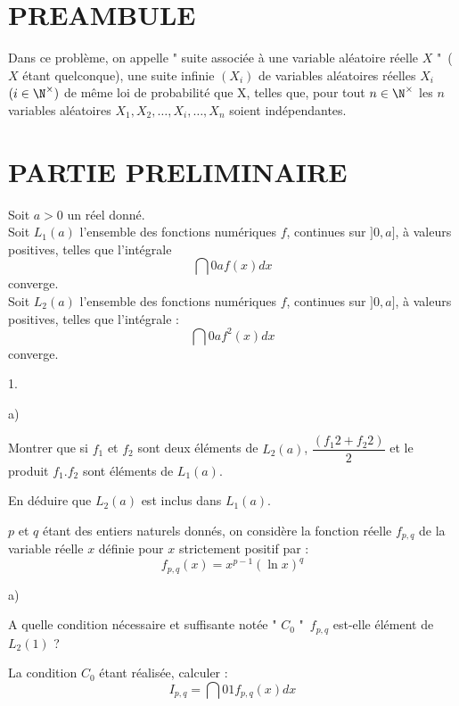 \documentclass[11pt]{article}%
\begin{document}
\section*{PREAMBULE}

Dans ce problème, on appelle " suite associée à une variable aléatoire
réelle $X$ "\ ($X$ étant quelconque), une suite infinie $(X_{i})$ de
variables
aléatoires réelles $X_{i}$ $(i\in \N^{\times })$ de même loi de
probabilité que X, telles que, pour tout $n\in \N^{\times }$ les $n$
variables aléatoires $X_{1},X_{2},\dots,X_{i},\dots,X_{n}$ soient
indépendantes.

\section*{PARTIE PRELIMINAIRE}

Soit $a>0$ un réel donné.\\
Soit $L_{1}(a)$ l'ensemble des fonctions numériques $f$, continues sur
$]0,a] $, à valeurs positives, telles que l'intégrale 
\[
\dint{0}{a}f(x)dx
\]
converge.\\
Soit $L_{2}(a)$ l'ensemble des fonctions numériques $f$, continues sur
$]0,a] $, à valeurs positives, telles que l'intégrale : 
\[
\dint{0}{a}f^{2}(x)dx
\]
converge.

\begin{noliste}{1.}
 \setlength{\itemsep}{4mm}
\item 

\begin{noliste}{a)}
 \setlength{\itemsep}{2mm}
\item Montrer que si $f_{1}$ et $f_{2}$ sont deux éléments de
$L_{2}(a)$, ${\dfrac{(f_{1}{2} + f_{2}{2})}{2}}$ et le produit
$f_{1}.f_{2}$ sont éléments
de $L_{1}(a)$.

\item En déduire que $L_{2}(a)$ est inclus dans $L_{1}(a)$.
\end{noliste}

\item $p$ et $q$ étant des entiers naturels donnés, on considère la
fonction
réelle $f_{p,q}$ de la variable réelle $x$ définie pour $x$ strictement
positif par : 
\[
f_{p,q}(x) = x^{p-1}(\ln x)^{q}
\]

\begin{noliste}{a)}
 \setlength{\itemsep}{2mm}
\item A quelle condition nécessaire et suffisante notée " $C_{0}$ "\
$f_{p,q} $ est-elle élément de $L_{2}(1)$ ?

\item La condition $C_{0}$ étant réalisée, calculer : 
\[
I_{p,q} = \dint{0}{1}f_{p,q}(x)dx
\]
\end{noliste}
\end{noliste}
\end{document}
